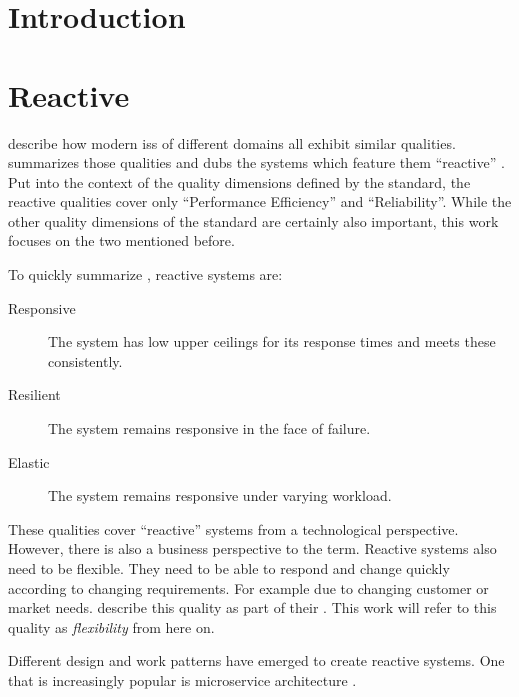 
\section{Introduction}\label{sec:introduction}

\section{Reactive }

\citeauthor{boner_reactive_2014} describe how modern \glspl{is} of different domains all exhibit similar qualities.
 summarizes those qualities and dubs the systems which feature them \enquote{reactive} \parencite{boner_reactive_2014}.
Put into the context of the quality dimensions defined by the  standard,
the reactive qualities cover only \enquote{Performance Efficiency} and \enquote{Reliability}.
While the other quality dimensions of the \citeauthor{iso_25010_2011} standard are certainly also important, this work focuses on the two mentioned before.

To quickly summarize \cite{boner_reactive_2014}, reactive systems are:

\begin{description}
  \item[Responsive] The system has low upper ceilings for its response times and meets these consistently.
  \item[Resilient] The system remains responsive in the face of failure.
  \item[Elastic] The system remains responsive under varying workload.
\end{description}

These qualities cover \enquote{reactive} systems from a technological perspective.
However, there is also a business perspective to the term.
Reactive systems also need to be flexible.
They need to be able to respond and change quickly according to changing requirements.
For example due to changing customer or market needs.
\citeauthor{beck2001agile} describe this quality as part of their  \parencite{beck2001agile}.
This work will refer to this quality as \emph{flexibility} from here on.

Different design and work patterns have emerged to create reactive systems.
One that is increasingly popular is microservice architecture \parencite{loukides_microservice_adoption_2020}.

